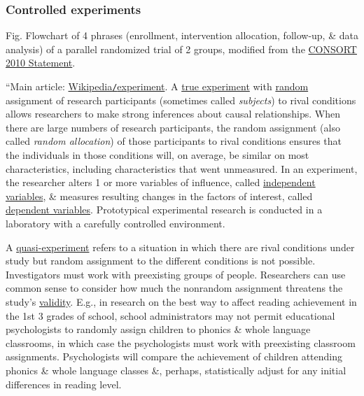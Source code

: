 \documentclass[oneside]{book}
\numberwithin{equation}{section}
\begin{document}
\subsubsection{Controlled experiments}
\textsf{Fig. Flowchart of 4 phrases (enrollment, intervention allocation, follow-up, \& data analysis) of a parallel randomized trial of 2 groups, modified from the \href{https://en.wikipedia.org/wiki/Consolidated_Standards_of_Reporting_Trials}{CONSORT 2010 Statement}.}

``Main article: \href{https://en.wikipedia.org/wiki/Experiment}{Wikipedia\texttt{/}experiment}. A \href{https://en.wikipedia.org/wiki/True_experiment}{true experiment} with \href{https://en.wikipedia.org/wiki/Randomized_controlled_trial}{random} assignment of research participants (sometimes called \textit{subjects}) to rival conditions allows researchers to make strong inferences about causal relationships. When there are large numbers of research participants, the random assignment (also called \textit{random allocation}) of those participants to rival conditions ensures that the individuals in those conditions will, on average, be similar on most characteristics, including characteristics that went unmeasured. In an experiment, the researcher alters 1 or more variables of influence, called \href{https://en.wikipedia.org/wiki/Independent_variable}{independent variables}, \& measures resulting changes in the factors of interest, called \href{https://en.wikipedia.org/wiki/Dependent_variable}{dependent variables}. Prototypical experimental research is conducted in a laboratory with a carefully controlled environment.

A \href{https://en.wikipedia.org/wiki/Quasi-experimental_design}{quasi-experiment} refers to a situation in which there are rival conditions under study but random assignment to the different conditions is not possible. Investigators must work with preexisting groups of people. Researchers can use common sense to consider how much the nonrandom assignment threatens the study's \href{https://en.wikipedia.org/wiki/Validity_(logic)}{validity}. E.g., in research on the best way to affect reading achievement in the 1st 3 grades of school, school administrators may not permit educational psychologists to randomly assign children to phonics \& whole language classrooms, in which case the psychologists must work with preexisting classroom assignments. Psychologists will compare the achievement of children attending phonics \& whole language classes \&, perhaps, statistically adjust for any initial differences in reading level.
\end{document}
